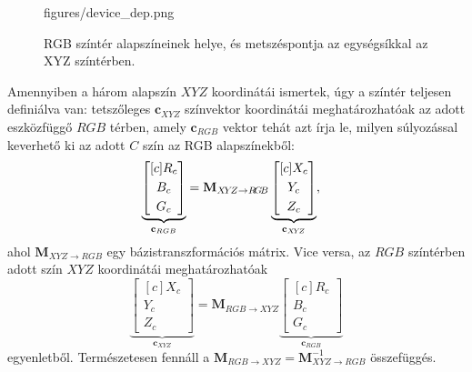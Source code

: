 \begin{figure}[]
	\centering
	\begin{overpic}[width = 0.75\columnwidth ]{figures/device_dep.png}
	\end{overpic}
	\caption{RGB színtér alapszíneinek helye, és metszéspontja az egységsíkkal az XYZ színtérben.}
	\label{Fig:device_dep}
\end{figure}
Amennyiben a három alapszín $XYZ$ koordinátái ismertek, úgy a színtér teljesen definiálva van:
tetszőleges $\mathbf{c}_{XYZ}$ színvektor koordinátái meghatározhatóak az adott eszközfüggő $RGB$ térben, amely $\mathbf{c}_{RGB}$ vektor tehát azt írja le, milyen súlyozással keverhető ki az adott $C$ szín az RGB alapszínekből:
\begin{equation} 
\underbrace{\begin{bmatrix}[c]
       R_c \\[0.3em]
       B_c \\[0.3em]
       G_c \end{bmatrix}}_{\mathbf{c}_{RGB}}
       =
     \mathbf{M}_{X\!Y\!Z \rightarrow R\!G\!B}
      \underbrace{\begin{bmatrix}[c]
       X_c \\[0.3em]
       Y_c \\[0.3em]
       Z_c \end{bmatrix}}_{\mathbf{c}_{X\!Y\!Z}},
\hspace{3mm}
\end{equation}
ahol $ \mathbf{M}_{X\!Y\!Z \rightarrow R\!G\!B}$ egy bázistranszformációs mátrix. 
Vice versa, az $RGB$ színtérben adott szín $XYZ$ koordinátái meghatározhatóak 
\begin{equation}
      \underbrace{\begin{bmatrix}[c]
       X_c \\[0.3em]
       Y_c \\[0.3em]
       Z_c \end{bmatrix}}_{\mathbf{c}_{X\!Y\!Z}} = 
     \mathbf{M}_{R\!G\!B \rightarrow X\!Y\!Z}
\underbrace{\begin{bmatrix}[c]
       R_c \\[0.3em]
       B_c \\[0.3em]
       G_c \end{bmatrix}}_{\mathbf{c}_{RGB}}
\end{equation}
egyenletből.
Természetesen fennáll a $\mathbf{M}_{R\!G\!B \rightarrow X\!Y\!Z} = \mathbf{M}_{X\!Y\!Z \rightarrow R\!G\!B}^{-1}$ összefüggés.

